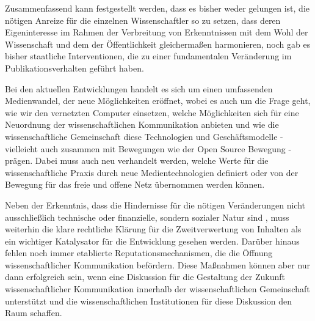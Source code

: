 Zusammenfassend kann festgestellt werden, dass es bisher weder gelungen ist, die nötigen Anreize für die einzelnen Wissenschaftler so zu setzen, dass deren Eigeninteresse im Rahmen der Verbreitung von Erkenntnissen mit dem Wohl der Wissenschaft und dem der Öffentlichkeit gleichermaßen harmonieren, noch gab es bisher staatliche Interventionen, die zu einer fundamentalen Veränderung im Publikationsverhalten geführt haben.

Bei den aktuellen Entwicklungen handelt es sich um einen umfassenden Medienwandel, der neue Möglichkeiten eröffnet, wobei es auch um die Frage geht, wie wir den vernetzten Computer einsetzen, welche Möglichkeiten sich für eine Neuordnung der wissenschaftlichen Kommunikation anbieten und wie die wissenschaftliche Gemeinschaft diese Technologien und Geschäftsmodelle - vielleicht auch zusammen mit Bewegungen wie der Open Source Bewegung - prägen. Dabei muss auch neu verhandelt werden, welche Werte für die wissenschaftliche Praxis durch neue Medientechnologien definiert oder von der Bewegung für das freie und offene Netz übernommen werden können.

Neben der Erkenntnis, dass die Hindernisse für die nötigen Veränderungen nicht ausschließlich technische oder finanzielle, sondern sozialer Natur sind \cite{nosek_2012_scientific}, muss weiterhin die klare rechtliche Klärung für die Zweitverwertung von Inhalten als ein wichtiger Katalysator für die Entwicklung gesehen werden. Darüber hinaus fehlen noch immer etablierte Reputationsmechanismen, die die Öffnung wissenschaftlicher Kommunikation befördern. Diese Maßnahmen können aber nur dann erfolgreich sein, wenn eine Diskussion für die Gestaltung der Zukunft wissenschaftlicher Kommunikation innerhalb der wissenschaftlichen Gemeinschaft unterstützt und die wissenschaftlichen Institutionen für diese Diskussion den Raum schaffen.

